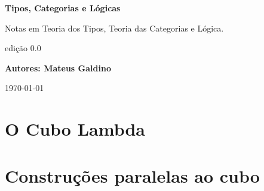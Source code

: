 \documentclass[a4paper]{article}
\theoremstyle{definition}
\begin{document}
    \begin{titlepage}
        \begin{center}
            \vspace*{1cm}
    
            \Huge
            \textbf{Tipos, Categorias e Lógicas}
    
            \vspace{0.5cm}
            \large
            Notas em Teoria dos Tipos, Teoria das Categorias e Lógica.
                  
            \vfill



            \Large
            edição \textbf{$0.0$}

            \textbf{Autores: Mateus Galdino}

            \today
                
        \end{center}
    \end{titlepage}

    \begingroup
        \hypersetup{hidelinks}    
        \tableofcontents

    \endgroup


    \newpage

        

    \newpage


        \part{O Cubo Lambda}
            \renewcommand*{\theHsection}{chX.\the\value{section}}

            
            \newpage
            
            \newpage
            
            \newpage
            
            \newpage
            
            \newpage
            

    \newpage

        \part{Construções paralelas ao cubo}

    \newpage
\end{document}
